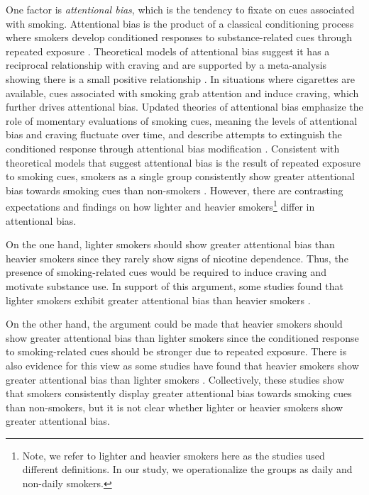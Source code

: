 \documentclass[empirical, authordate]{jote-new-article}
\begin{document}
One factor is \emph{attentional bias}, which is the tendency to fixate on cues associated with smoking. Attentional bias is the product of a classical conditioning process where smokers develop conditioned responses to substance-related cues through repeated exposure \parencite{Field2008}. Theoretical models of attentional bias suggest it has a reciprocal relationship with craving and are supported by a meta-analysis showing there is a small positive relationship \parencite{Field2009}. In situations where cigarettes are available, cues associated with smoking grab attention and induce craving, which further drives attentional bias. Updated theories of attentional bias emphasize the role of momentary evaluations of smoking cues, meaning the levels of attentional bias and craving fluctuate over time, and describe attempts to extinguish the conditioned response through attentional bias modification \parencite{Field2016}. Consistent with theoretical models that suggest attentional bias is the result of repeated exposure to smoking cues, smokers as a single group consistently show greater attentional bias towards smoking cues than non-smokers \parencite{Baschnagel2013, Ehrman2002, Kang2012, Mogg2003}. However, there are contrasting expectations and findings on how lighter and heavier smokers\footnote{Note, we refer to lighter and heavier smokers here as the studies used different definitions. In our study, we operationalize the groups as daily and non-daily smokers.} differ in attentional bias.

On the one hand, lighter smokers should show greater attentional bias than heavier smokers since they rarely show signs of nicotine dependence. Thus, the presence of smoking-related cues would be required to induce craving and motivate substance use. In support of this argument, some studies found that lighter smokers exhibit greater attentional bias than heavier smokers \parencite{Bradley2003, Hogarth2003, Mogg2005}.

On the other hand, the argument could be made that heavier smokers should show greater attentional bias than lighter smokers since the conditioned response to smoking-related cues should be stronger due to repeated exposure. There is also evidence for this view as some studies have found that heavier smokers show greater attentional bias than lighter smokers \parencite{Chanon2010, Vollstädt-Klein2011, Zack2001}. Collectively, these studies show that smokers consistently display greater attentional bias towards smoking cues than non-smokers, but it is not clear whether lighter or heavier smokers show greater attentional bias.
\end{document}
